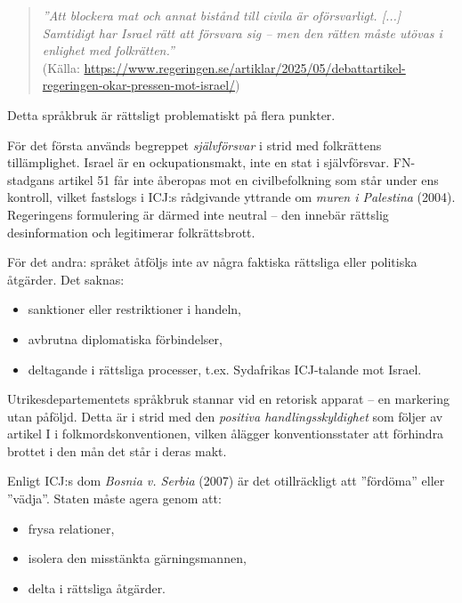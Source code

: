 \begin{quote}
\textit{”Att blockera mat och annat bistånd till civila är oförsvarligt. [...] Samtidigt har Israel rätt att försvara sig – men den rätten måste utövas i enlighet med folkrätten.”}\\
(Källa: \url{https://www.regeringen.se/artiklar/2025/05/debattartikel-regeringen-okar-pressen-mot-israel/})
\end{quote}

\medskip

Detta språkbruk är rättsligt problematiskt på flera punkter.

För det första används begreppet \textit{självförsvar} i strid med folkrättens tillämplighet. Israel är en ockupationsmakt, inte en stat i självförsvar. FN-stadgans artikel 51 får inte åberopas mot en civilbefolkning som står under ens kontroll, vilket fastslogs i ICJ:s rådgivande yttrande om \textit{muren i Palestina} (2004). Regeringens formulering är därmed inte neutral – den innebär rättslig desinformation och legitimerar folkrättsbrott.

\medskip

För det andra: språket åtföljs inte av några faktiska rättsliga eller politiska åtgärder. Det saknas:

\begin{itemize}
  \item sanktioner eller restriktioner i handeln,
  \item avbrutna diplomatiska förbindelser,
  \item deltagande i rättsliga processer, t.ex. Sydafrikas ICJ-talande mot Israel.
\end{itemize}

Utrikesdepartementets språkbruk stannar vid en retorisk apparat – en markering utan påföljd. Detta är i strid med den \textit{positiva handlingsskyldighet} som följer av artikel I i folkmordskonventionen, vilken ålägger konventionsstater att förhindra brottet i den mån det står i deras makt.

\medskip

Enligt ICJ:s dom \textit{Bosnia v. Serbia} (2007) är det otillräckligt att ”fördöma” eller ”vädja”. Staten måste agera genom att:

\begin{itemize}
    \item frysa relationer,
    \item isolera den misstänkta gärningsmannen,
    \item delta i rättsliga åtgärder.
\end{itemize}


